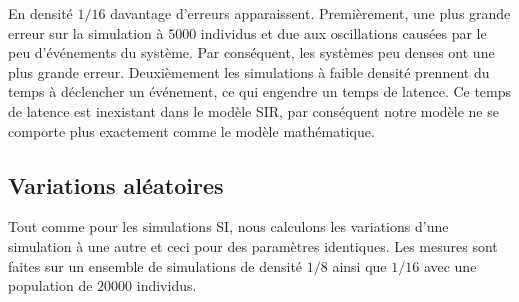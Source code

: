 En densité $1/16$ davantage d'erreurs apparaissent. Premièrement, une plus grande erreur sur la simulation à $5000$ individus et due aux oscillations causées par le peu d'événements du système. Par conséquent, les systèmes peu denses ont une plus grande erreur. Deuxièmement les simulations à faible densité prennent du temps à déclencher un événement, ce qui engendre un temps de latence. Ce temps de latence est inexistant dans le modèle SIR, par conséquent notre modèle ne se comporte plus exactement comme le modèle mathématique.

\newpage

\subsection{Variations aléatoires}

Tout comme pour les simulations SI, nous calculons les variations d'une simulation à une autre et ceci pour des paramètres identiques. Les mesures sont faites sur un ensemble de simulations de densité $1/8$ ainsi que $1/16$ avec une population de $20000$ individus.

